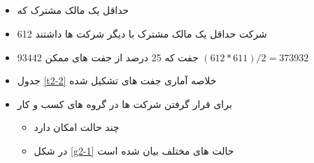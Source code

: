 \documentclass[12pt, a4paper]{article}
\begin{document}
\subsection{ }
\begin{itemize}
	\item 
	حداقل یک مالک مشترک که 
		\item 
		612 شرکت حداقل یک مالک مشترک با دیگر شرکت ها داشتند
	\item 
	93442 جفت که 25 درصد از جفت های ممکن
	$ (612*611)/2 = 373932$

	\item 
	جدول
	 \ref{t2-2}
	 خلاصه آماری جفت های تشکیل شده
	\item 
	برای قرار گرفتن شرکت ها در گروه های کسب و کار 
	\begin{itemize}
		\item
		 چند حالت امکان دارد 
		 \item
		 در شکل 
		 \ref{g2-1}
		 حالت های مختلف بیان شده است
	\end{itemize}
	
\end{itemize}

 
\begin{LTR}
\end{LTR}
\end{document}
